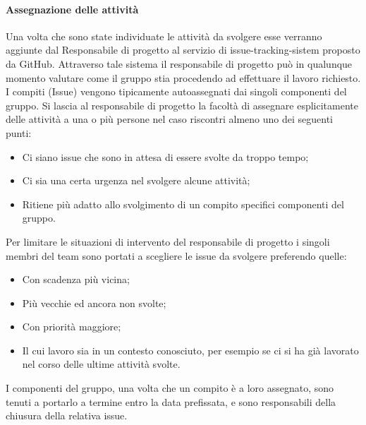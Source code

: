 \paragraph{Assegnazione delle attività}
Una volta che sono state individuate le attività da svolgere esse verranno aggiunte dal Responsabile di progetto al servizio di issue-tracking-sistem proposto da GitHub.
Attraverso tale sistema il responsabile di progetto può in qualunque momento valutare come il gruppo stia procedendo ad effettuare il lavoro richiesto.\\
I compiti (Issue) vengono tipicamente autoassegnati dai singoli componenti del gruppo. Si lascia al responsabile di progetto la facoltà di assegnare esplicitamente delle attività a una o più persone nel caso riscontri almeno uno dei seguenti punti:
\begin{itemize}
    \item Ci siano issue che sono in attesa di essere svolte da troppo tempo;
    \item Ci sia una certa urgenza nel svolgere alcune attività;
    \item Ritiene più adatto allo svolgimento di un compito specifici componenti del gruppo.
\end{itemize}
Per limitare le situazioni di intervento del responsabile di progetto i singoli membri del team sono portati a scegliere le issue da svolgere preferendo quelle:
\begin{itemize}
    \item Con scadenza più vicina;
    \item Più vecchie ed ancora non svolte;
    \item Con priorità maggiore;
    \item Il cui lavoro sia in un contesto conosciuto, per esempio se ci si ha già lavorato nel corso delle ultime attività svolte.
\end{itemize}
I componenti del gruppo, una volta che un compito è a loro assegnato, sono tenuti a portarlo a termine entro la data prefissata, e sono responsabili della chiusura della relativa issue.

